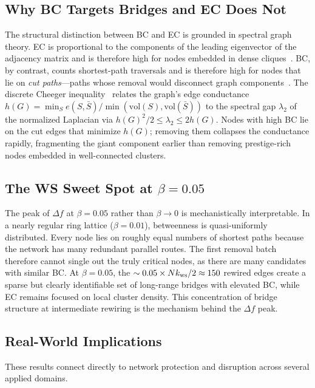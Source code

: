 \documentclass[journal]{IEEEtran}
\begin{document}
\subsection{Why BC Targets Bridges and EC Does Not}

The structural distinction between BC and EC is grounded in spectral graph
theory.
EC is proportional to the components of the leading eigenvector of the
adjacency matrix and is therefore high for nodes embedded in dense
cliques~\cite{bonacich1987power}.
BC, by contrast, counts shortest-path traversals and is therefore high for
nodes that lie on \emph{cut paths}---paths whose removal would disconnect
graph components~\cite{freeman1977set}.
The discrete Cheeger inequality~\cite{chung1997spectral} relates the graph's
edge conductance $h(G) = \min_{S} e(S, \bar{S}) / \min(\mathrm{vol}(S), \mathrm{vol}(\bar{S}))$
to the spectral gap $\lambda_2$ of the normalized Laplacian via
$h(G)^2/2 \leq \lambda_2 \leq 2h(G)$.
Nodes with high BC lie on the cut edges that minimize $h(G)$; removing them
collapses the conductance rapidly, fragmenting the giant component earlier
than removing prestige-rich nodes embedded in well-connected clusters.

\subsection{The WS Sweet Spot at \(\beta = 0.05\)}

The peak of $\Delta f$ at $\beta = 0.05$ rather than $\beta\to0$ is
mechanistically interpretable.
In a nearly regular ring lattice ($\beta = 0.01$), betweenness is
quasi-uniformly distributed. Every node lies on roughly equal numbers of
shortest paths because the network has many redundant parallel routes.
The first removal batch therefore cannot single out the truly critical
nodes, as there are many candidates with similar BC.
At $\beta = 0.05$, the $\sim 0.05 \times Nk_{\rm ws}/2 \approx 150$ rewired
edges create a sparse but clearly identifiable set of long-range bridges
with elevated BC, while EC remains focused on local cluster density.
This concentration of bridge structure at intermediate rewiring is the
mechanism behind the $\Delta f$ peak.

\subsection{Real-World Implications}

These results connect directly to network protection and disruption
across several applied domains.
\end{document}
